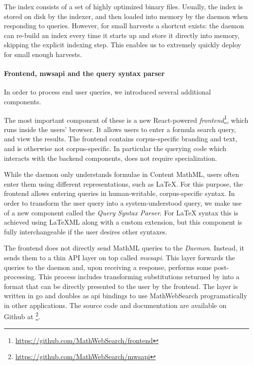 The index consists of a set of highly optimized binary files. 
Usually, the index is stored on disk by the indexer, and then loaded into memory by the \MWS daemon when responding to queries. 
However, for small harvests a shortcut exists: the \MWS daemon can re-build an index every time it starts up and store it directly into memory, skipping the explicit indexing step. 
This enables us to extremely quickly deploy \MWS for small enough harvests. 
\paragraph{Frontend, mwsapi and the query syntax parser}

In order to process end user queries, we introduced several additional components.

The most important component of these is a new React-powered \textit{frontend}\footnote{\url{https://github.com/MathWebSearch/frontend}}, which runs inside the users' browser. 
It allows users to enter a formula search query, and view the results. 
The frontend contains corpus-specific branding and text, and is otherwise not corpus-specific. 
In particular the querying code which interacts with the backend components, does not require specialization. 

While the \MWS daemon only understands formulae in Content MathML, users often enter them using different representations, such as \LaTeX. 
For this purpose, the frontend allows entering queries in human-writable, corpus-specific syntax. 
In order to transform the user query into a system-understood query, we make use of a new component called the \textit{Query Syntax Parser}. 
For {\LaTeX} syntax this is achieved using {\LaTeX}ML along with a custom \MWS extension, but this component is fully interchangeable if the user desires other syntaxes. 

The frontend does not directly send MathML queries to the \textit{Daemon}.
Instead, it sends them to a thin API layer on top called \textit{mwsapi}. 
This layer forwards the queries to the daemon and, upon receiving a response, performs some post-processing. 
This process includes transforming substitutions returned by \MWS into a format that can be directly presented to the user by the frontend. 
The layer is written in go and doubles as api bindings to use MathWebSearch programatically in other applications. 
The source code and documentation are available on Github at \footnote{\url{https://github.com/MathWebSearch/mwsapi}}. 

